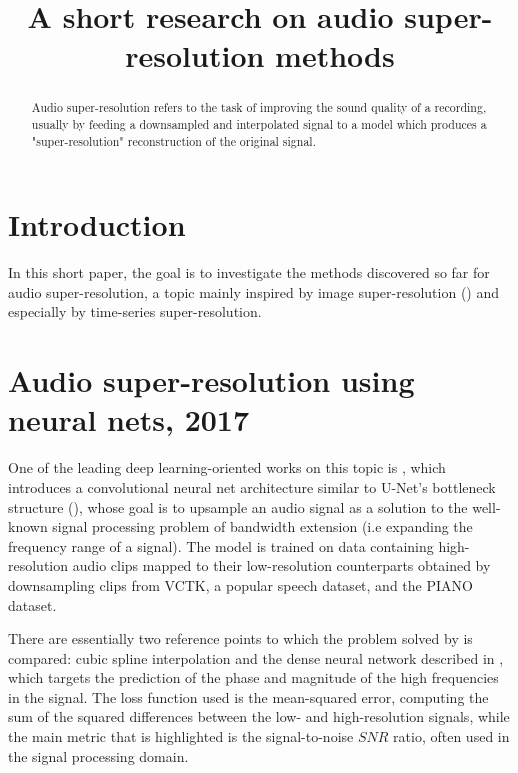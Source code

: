 \documentclass[conference]{IEEEtran}
\begin{document}
\title{A short research on audio super-resolution methods \\
}

\author{
}

\maketitle

\begin{abstract}
Audio super-resolution refers to the task of improving the sound quality of a recording, usually by feeding a downsampled and interpolated signal to a model which produces a "super-resolution" reconstruction of the original signal.
\end{abstract}

\section{Introduction}
	In this short paper, the goal is to investigate the methods discovered so far for audio super-resolution, a topic mainly inspired by image super-resolution (\textcite{ledig2017photorealistic}) and especially by time-series super-resolution. 
\\

\section{Audio super-resolution using neural nets, 2017}

	One of the leading deep learning-oriented works on this topic is \textcite{kuleshov2017audio}, which introduces a convolutional neural net architecture similar to U-Net's bottleneck structure (\textcite{ronneberger2015unet}), whose goal is to upsample an audio signal as a solution to the well-known signal processing problem of bandwidth extension (i.e expanding the frequency range of a signal). The model is trained on data containing high-resolution audio clips mapped to their low-resolution counterparts obtained by downsampling clips from VCTK, a popular speech dataset, and the PIANO dataset. 

	There are essentially two reference points to which the problem solved by \textcite{kuleshov2017audio} is compared: cubic spline interpolation and the dense neural network described in \textcite{lietal2015}, which targets the prediction of the phase and magnitude of the high frequencies in the signal. The loss function used is the mean-squared error, computing the sum of the squared differences between the low- and high-resolution signals, while the main metric that is highlighted is the signal-to-noise $ SNR $ ratio, often used in the signal processing domain. 
\end{document}
